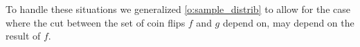 To handle these situations we generalized \cref{o:sample_distrib} to allow for the case where the cut between the set of coin flips $f$ and $g$ depend on, may depend on the result of $f$.
%

